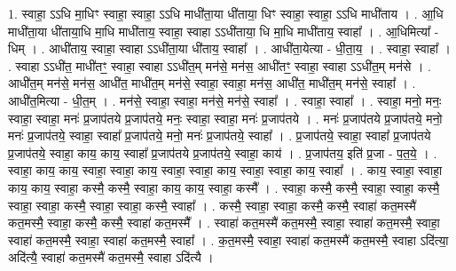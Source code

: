 \documentclass[17pt]{extarticle}
\begin{document}
1. स्वाहा॒ ऽऽधि मा॒धिꣳ स्वाहा॒ स्वाहा॒ ऽऽधि माधी॑ता॒या धी॑ताया॒ धिꣳ स्वाहा॒ स्वाहा॒ ऽऽधि माधी॑ताय । . आ॒धि माधी॑ता॒या धी॑ताया॒धि मा॒धि माधी॑ताय॒ स्वाहा॒ स्वाहा ऽऽधी॑ताया॒ धि मा॒धि माधी॑ताय॒ स्वाहा᳚ । . आ॒धिमित्या᳚ - धिम् । . आधी॑ताय॒ स्वाहा॒ स्वाहा ऽऽधी॑ता॒या धी॑ताय॒ स्वाहा᳚ । . आधी॑ता॒येत्या - धी॒ता॒य॒ । . स्वाहा॒ स्वाहा᳚ । . स्वाहा ऽऽधी॑त॒ माधी॑तꣳ॒॒ स्वाहा॒ स्वाहा ऽऽधी॑त॒म् मन॑से॒ मन॑स॒ आधी॑तꣳ॒॒ स्वाहा॒ स्वाहा ऽऽधी॑त॒म् मन॑से । . आधी॑त॒म् मन॑से॒ मन॑स॒ आधी॑त॒ माधी॑त॒म् मन॑से॒ स्वाहा॒ स्वाहा॒ मन॑स॒ आधी॑त॒ माधी॑त॒म् मन॑से॒ स्वाहा᳚ । . आधी॑त॒मित्या - धी॒त॒म् । . मन॑से॒ स्वाहा॒ स्वाहा॒ मन॑से॒ मन॑से॒ स्वाहा᳚ । . स्वाहा॒ स्वाहा᳚ । . स्वाहा॒ मनो॒ मनः॒ स्वाहा॒ स्वाहा॒ मनः॑ प्र॒जाप॑तये प्र॒जाप॑तये॒ मनः॒ स्वाहा॒ स्वाहा॒ मनः॑ प्र॒जाप॑तये । . मनः॑ प्र॒जाप॑तये प्र॒जाप॑तये॒ मनो॒ मनः॑ प्र॒जाप॑तये॒ स्वाहा॒ स्वाहा᳚ प्र॒जाप॑तये॒ मनो॒ मनः॑ प्र॒जाप॑तये॒ स्वाहा᳚ । . प्र॒जाप॑तये॒ स्वाहा॒ स्वाहा᳚ प्र॒जाप॑तये प्र॒जाप॑तये॒ स्वाहा॒ काय॒ काय॒ स्वाहा᳚ प्र॒जाप॑तये प्र॒जाप॑तये॒ स्वाहा॒ काय॑ । . प्र॒जाप॑तय॒ इति॑ प्र॒जा - प॒त॒ये॒ । . स्वाहा॒ काय॒ काय॒ स्वाहा॒ स्वाहा॒ काय॒ स्वाहा॒ स्वाहा॒ काय॒ स्वाहा॒ स्वाहा॒ काय॒ स्वाहा᳚ । . काय॒ स्वाहा॒ स्वाहा॒ काय॒ काय॒ स्वाहा॒ कस्मै॒ कस्मै॒ स्वाहा॒ काय॒ काय॒ स्वाहा॒ कस्मै᳚ । . स्वाहा॒ कस्मै॒ कस्मै॒ स्वाहा॒ स्वाहा॒ कस्मै॒ स्वाहा॒ स्वाहा॒ कस्मै॒ स्वाहा॒ स्वाहा॒ कस्मै॒ स्वाहा᳚ । . कस्मै॒ स्वाहा॒ स्वाहा॒ कस्मै॒ कस्मै॒ स्वाहा॑ कत॒मस्मै॑ कत॒मस्मै॒ स्वाहा॒ कस्मै॒ कस्मै॒ स्वाहा॑ कत॒मस्मै᳚ । . स्वाहा॑ कत॒मस्मै॑ कत॒मस्मै॒ स्वाहा॒ स्वाहा॑ कत॒मस्मै॒ स्वाहा॒ स्वाहा॑ कत॒मस्मै॒ स्वाहा॒ स्वाहा॑ कत॒मस्मै॒ स्वाहा᳚ । . क॒त॒मस्मै॒ स्वाहा॒ स्वाहा॑ कत॒मस्मै॑ कत॒मस्मै॒ स्वाहा ऽदि॑त्या॒ अदि॑त्यै॒ स्वाहा॑ कत॒मस्मै॑ कत॒मस्मै॒ स्वाहा ऽदि॑त्यै । \newline
\end{document}
